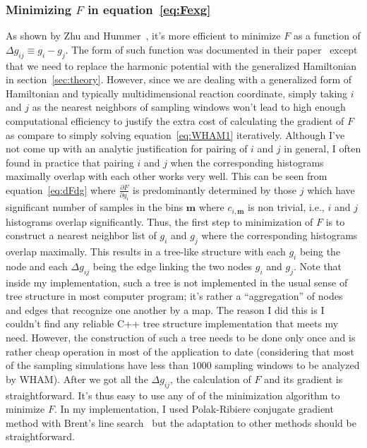 \subsubsection{Minimizing $F$ in equation~\ref{eq:Fexg}}
As shown by Zhu and Hummer~\cite{Zhu2012}, it's more efficient to minimize $F$
as a function of $\Delta g_{ij} \equiv g_{i} - g_{j}$.  The form of such
function was documented in their paper~\cite{Zhu2012} except that we need to
replace the harmonic potential with the generalized Hamiltonian in
section~\ref{sec:theory}. However, since we are dealing with a generalized form
of Hamiltonian and typically multidimensional reaction coordinate, simply
taking $i$ and $j$ as the nearest neighbors of sampling windows won't lead to
high enough computational efficiency to justify the extra cost of calculating
the gradient of $F$ as compare to simply solving equation~\ref{eq:WHAM1}
iteratively. Although I've not come up with an analytic justification for
pairing of $i$ and $j$ in general, I often found in practice that pairing $i$
and $j$ when the corresponding histograms maximally overlap with each other
works very well. This can be seen from equation~\ref{eq:dFdg} where
$\frac{\partial F}{\partial g_{i}}$ is predominantly determined by those $j$
which have significant number of samples in the bins $\mathbf{m}$ where
$c_{i,\mathbf{m}}$ is non trivial, i.e., $i$ and $j$ histograms overlap significantly.
Thus, the first step to minimization of $F$ is to construct a nearest neighbor 
list of $g_{i}$ and $g_{j}$ where the corresponding histograms overlap maximally.
This results in a tree-like structure with each $g_{i}$ being the node and 
each $\Delta g_{ij}$ being the edge linking the two nodes $g_{i}$ and $g_{j}$.
Note that inside my implementation, such a tree is not implemented in the 
usual sense of tree structure in most computer program; it's rather a 
``aggregation'' of nodes and edges that recognize one another by a map. 
The reason I did this is I couldn't find any reliable C++ tree structure 
implementation that meets my need. However, the construction of such a 
tree needs to be done only once and is rather cheap operation in most of 
the application to date (considering that most of the sampling simulations
have less than $1000$ sampling windows to be analyzed by WHAM). After
we got all the $\Delta g_{ij}$, the calculation of $F$ and its gradient
is straightforward. It's thus easy to use any of of the minimization 
algorithm to minimize $F$. In my implementation, I used Polak-Ribiere 
conjugate gradient method with Brent's line search~\cite{NumRec2007} but 
the adaptation to other methods should be straightforward. 

